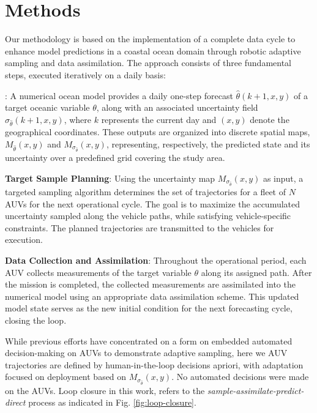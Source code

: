 \section{Methods}

Our methodology is based on the implementation of a complete data cycle
to enhance model predictions in a coastal ocean domain through robotic
adaptive sampling and data assimilation. The approach consists of three
fundamental steps, executed iteratively on a daily basis:

\begin{description}

\item[Model Forecast and Uncertainty Projection]: A numerical ocean
  model provides a daily one-step forecast $\hat{\theta}(k+1, x, y)$
  of a target oceanic variable $\theta$, along with an associated
  uncertainty field $\sigma_{\hat{\theta}}(k+1, x, y)$, where $k$
  represents the current day and $(x, y)$ denote the geographical
  coordinates.  These outputs are organized into discrete spatial
  maps, $M_{\hat{\theta}}(x, y)$ and
  $M_{\sigma_{\hat{\theta}}}(x, y)$, representing, respectively, the
  predicted state and its uncertainty over a predefined grid covering
  the study area.
    
\item \textbf{Target Sample Planning}: Using the uncertainty map
  $M_{\sigma_{\hat{\theta}}}(x, y)$ as input, a targeted sampling
  algorithm determines the set of trajectories for a fleet of $N$ AUVs
  for the next operational cycle. The goal is to maximize the
  accumulated uncertainty sampled along the vehicle paths, while
  satisfying vehicle-specific constraints. The planned trajectories
  are transmitted to the vehicles for execution.

\item \textbf{Data Collection and Assimilation}: Throughout the
  operational period, each AUV collects measurements of the target
  variable $\theta$ along its assigned path. After the mission is
  completed, the collected measurements are assimilated into the
  numerical model using an appropriate data assimilation scheme. This
  updated model state serves as the new initial condition for the next
  forecasting cycle, closing the loop.

\end{description}

While previous efforts have concentrated on a form on embedded
automated decision-making on AUVs
\cite{mcgann08a,mcgann08b,ryan10,py10,Das-2010-637,das10,olaya12,rajan12}
to demonstrate adaptive sampling, here we AUV trajectories are defined
by human-in-the-loop decisions apriori, with adaptation focused on
deployment based on $M_{\sigma_{\hat{\theta}}}(x, y)$. No automated
decisions were made on the AUVs. Loop closure in this work, refers to
the \emph{sample-assimilate-predict-direct} process as indicated in
Fig. \ref{fig:loop-closure}.

